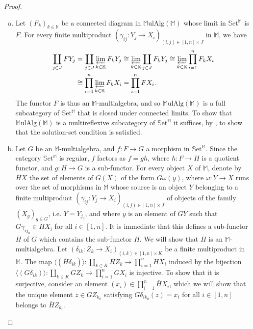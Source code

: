 \documentclass{article}
\newcommand{\bb}[1]{{\mathbb{#1}}}
\newcommand{\Set}{\mathbb{S}\mathrm{et}}
\newcommand{\MulAlg}{\mathbb{M}\mathrm{ulAlg}}
\begin{document}
\begin{proof}
  \begin{enumerate}[a)]
    \item Let $(F_k)_{k\in\bb{K}}$ be a connected diagram in $\MulAlg(\bb{M})$ whose limit in $\Set^\bb{M}$ is $F$.
      For every finite multiproduct $(\gamma_{ij}\colon Y_j\to X_i)_{(i,j)\in[1,n]\times J}$ in $\bb{M}$, we have \cite[{}3.5.4.a]{2}
      \[
        \begin{aligned}
          \coprod_{j\in J} FY_j
          &= \coprod_{j\in J} \varprojlim_{k\in\bb{K}} F_kY_j
          \cong \varprojlim_{k\in\bb{K}} \coprod_{j\in J} F_kY_j
          \cong \varprojlim_{k\in\bb{K}} \prod_{i=1}^n F_kX_i
        \\&\cong \prod_{i=1}^n \varprojlim_{k\in\bb{K}} F_kX_i
          = \prod_{i=1}^n FX_i.
        \end{aligned}
      \]
      The functor $F$ is thus an $\bb{M}$-multialgebra, and so $\MulAlg(\bb{M})$ is a full subcategory of $\Set^\bb{M}$ that is closed under connected limits.
      To show that $\MulAlg(\bb{M})$ is a multireflexive subcategory of $\Set^\bb{M}$ it suffices, by \cite[Theorem~3.6.1]{2}, to show that the solution-set condition is satisfied.
    \item Let $G$ be an $\bb{M}$-multialgebra, and $f\colon F\to G$ a morphism in $\Set^\bb{M}$.
      Since the category $\Set^\bb{M}$ is regular, $f$ factors as $f=gh$, where $h\colon F\to H$ is a quotient functor, and $g\colon H\to G$ is a sub-functor.
      For every object $X$ of $\bb{M}$, denote by $\bar{H}X$ the set of elements of $G(X)$ of the form $G\omega(y)$, where $\omega\colon Y\to X$ runs over the set of morphisms in $\bb{M}$ whose source is an object $Y$ belonging to a finite multiproduct $(\gamma_{ij}\colon Y_j\to X_i)_{(i,j)\in[1,n]\times J}$ of objects of the family $(X_g)_{g\in G}$, i.e. $Y=Y_{j_0}$, and where $y$ is an element of $GY$ such that $G\gamma_{ij_0}\in HX_i$ for all $i\in[1,n]$.
      It is immediate that this defines a sub-functor $\bar{H}$ of $G$ which contains the sub-functor $H$.
      We will show that $\bar{H}$ is an $\bb{M}$-multialgebra.
      Let $(\delta_{ik}\colon Z_k\to X_i)_{(i,k)\in[1,n]\times K}$ be a finite multiproduct in $\bb{M}$.
      The map $\langle(\bar{H}\delta_{ik})\rangle\colon\coprod_{k\in K}\bar{H}Z_k\to\prod_{i=1}^n\bar{H}X_i$ induced by the bijection $\langle(G\delta_{ik})\rangle\colon\coprod_{k\in K}GZ_k\to\prod_{i=1}^nGX_i$ is injective.
      To show that it is surjective, consider an element $(x_i)\in\prod_{i=1}^n\bar{H}X_i$, which we will show that the unique element $z\in GZ_{k_0}$ satisfying $G\delta_{ik_0}(z)=x_i$ for all $i\in[1,n]$ belongs to $\bar{H}Z_{k_0}$.

\end{enumerate}
\end{proof}
\end{document}
